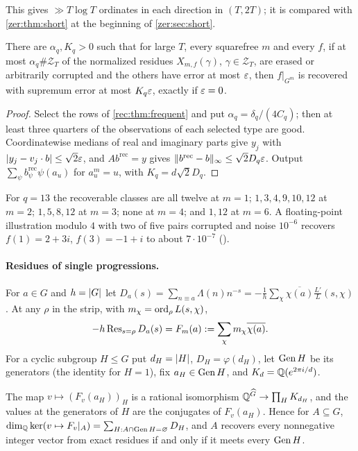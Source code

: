 This gives $\gg T\log T$ ordinates in each direction in $(T,2T)$; it is compared with
\cref{zer:thm:short} at the beginning of \cref{zer:sec:short}.

\begin{theorem}\label{rec:thm:stable}
There are $\alpha_q,K_q>0$ such that for large $T$, every squarefree $m$ and every $f$, if at most
$\alpha_q\#\mathcal Z_T$ of the normalized residues $X_{m,f}(\gamma)$, $\gamma\in\mathcal Z_T$, are erased or
arbitrarily corrupted and the others have error at most $\varepsilon$, then $f|_{G^m}$ is recovered with
supremum error at most $K_q\varepsilon$, exactly if $\varepsilon=0$.
\end{theorem}

\begin{proof}
Select the rows of \cref{rec:thm:frequent} and put $\alpha_q=\delta_q/(4C_q)$; then at least three
quarters of the observations of each selected type are good. Coordinatewise medians of real and
imaginary parts give $y_j$ with $\lvert y_j-v_j\cdot b\rvert\le\sqrt2\varepsilon$, and $Ab^{\mathrm{rec}}=y$ gives
$\lVert b^{\mathrm{rec}}-b\rVert_\infty\le\sqrt2D_q\varepsilon$. Output $\sum_\psi b_\psi^{\mathrm{rec}}\psi(a_u)$ for
$a_u^m=u$, with $K_q=d\sqrt2D_q$.
\end{proof}

For $q=13$ the recoverable classes are all twelve at $m=1$; $1,3,4,9,10,12$ at $m=2$; $1,5,8,12$ at
$m=3$; none at $m=4$; and $1,12$ at $m=6$. A floating-point illustration modulo $4$ with two of five
pairs corrupted and noise $10^{-6}$ recovers $f(1)=2+3i$, $f(3)=-1+i$ to about $7\cdot10^{-7}$
().

\paragraph{Residues of single progressions.}
For $a\in G$ and $h=\lvert G\rvert$ let
$D_a(s)=\sum_{n\equiv a}\Lambda(n)n^{-s}=-\frac1h\sum_\chi\overline{\chi(a)}\frac{L'}L(s,\chi)$. At any
$\rho$ in the strip, with $m_\chi=\operatorname{ord}_\rho L(s,\chi)$,
\begin{equation}\label{rec:eq:progres}
 -h\operatorname{Res}_{s=\rho}D_a(s)=F_m(a):=\sum_\chi m_\chi\overline{\chi(a)} .
\end{equation}
For a cyclic subgroup $H\le G$ put $d_H=\lvert H\rvert$, $D_H=\varphi(d_H)$, let $\operatorname{Gen} H$ be its generators
(the identity for $H=1$), fix $a_H\in\operatorname{Gen} H$, and $K_d=\mathbb{Q}(e^{2\pi i/d})$.

\begin{lemma}\label{rec:lem:blocks}
The map $v\mapsto(F_v(a_H))_H$ is a rational isomorphism $\mathbb{Q}^{\widehat G}\to\prod_HK_{d_H}$, and the
values at the generators of $H$ are the conjugates of $F_v(a_H)$. Hence for $A\subseteq G$,
$\dim_{\mathbb{Q}}\ker(v\mapsto F_v|_A)=\sum_{H:A\cap\operatorname{Gen} H=\varnothing}D_H$, and $A$ recovers every
nonnegative integer vector from exact residues if and only if it meets every $\operatorname{Gen} H$.
\end{lemma}

